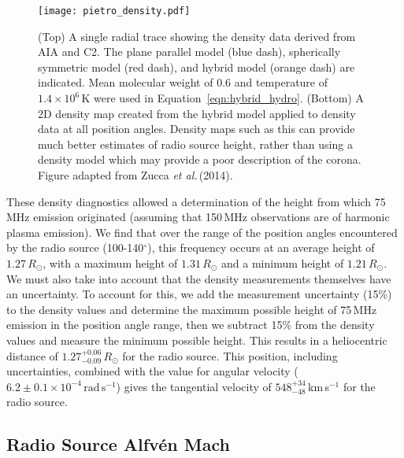 \begin{figure}[t!]
\begin{center}
\texttt{[image: pietro\_density.pdf]}
\caption[2D density map of the corona]{(Top) A single radial trace showing the density data derived from AIA and C2. The plane parallel model (blue dash), spherically symmetric model (red dash), and hybrid model (orange dash) are indicated. Mean molecular weight of 0.6 and temperature of $1.4\times10^{6}$\,K were used in Equation~\ref{eqn:hybrid_hydro}. (Bottom) A 2D density map created from the hybrid model applied to density data at all position angles.
Density maps such as this can provide much better estimates of radio source height, rather than using a density model which may provide a poor description of the corona. Figure adapted from Zucca \emph{et al.}\,(2014).}
\label{fig:density_map}
\end{center}
\end{figure}

These density diagnostics allowed a determination of the height from which 75\,MHz emission originated (assuming that 150\,MHz observations are of harmonic plasma emission). We find that over the range of the position angles encountered by the radio source (100-140$^{\circ}$), this frequency occurs at an average height of $1.27\,R_{\odot}$, with a maximum height of $1.31\,R_{\odot}$ and a minimum height of $1.21\,R_{\odot}$. We must also take into account that the density measurements themselves have an uncertainty. To account for this, we add the measurement uncertainty (15\%) to the density values and determine the maximum possible height of 75\,MHz emission in the position angle range, then we subtract 15\% from the density values and measure the minimum possible height. This results in a heliocentric distance of $1.27^{+0.06}_{-0.09}\,R_{\odot}$ for the radio source. This position, including uncertainties, combined with the value for angular velocity ($6.2\pm0.1\times10^{-4}\,\mathrm{rad\,s^{-1}} $) gives the tangential velocity of $548^{+34}_{-48}$\,km\,s$^{-1}$ for the radio source.


\subsection{Radio Source Alfv\'{e}n Mach}

